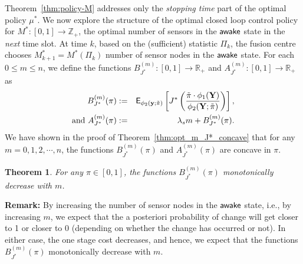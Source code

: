\documentclass[journal]{IEEEtran}
\newcommand{\PPHI}[1]{\phi_2({\bf y} ;\tilde{\pi})}
\newtheorem{theorem}{Theorem}
\newcommand{\wake}{{${\sf awake }$}}
\begin{document}
Theorem~\ref{thm:policy-M} addresses only the {\em stopping time} 
part of the optimal policy $\mu^*$. We now explore the structure of the 
optimal closed loop control policy for $M^*:[0, 1]\to\mathbb{Z}_+$, the 
optimal number of sensors in the {\wake} state in the {\em next} time 
slot. At time $k$, based on the (sufficient) statistic $\Pi_k$, the 
fusion centre chooses $M^*_{k+1}=M^*(\Pi_k)$ number of sensor nodes in
the {\wake} state. For each $0 \le m \le n$, we define the functions 
$B_{J^*}^{(m)}:[0,1]\to\mathbb{R}_+$ and 
$A_{J^*}^{(m)}:[0,1]\to\mathbb{R}_+$ as
\begin{eqnarray*} 
B_{J^*}^{(m)}(\pi) & := & {\mathsf
E}_{\PPHI{m}}\left[J^*\left(\frac{\tilde{\pi}\cdot\phi_1({\bf Y})}{\phi_2({\bf Y};\tilde{\pi})}\right)\right], \\ 
\text{and } A_{J^*}^{(m)}(\pi) & := & \lambda_sm + B_{J^*}^{(m)}({\pi}). 
\end{eqnarray*}
We have shown in the proof of Theorem~\ref{thm:opt_m_J*_concave}
that for any $m=0,1,2,\cdots,n$, the functions $B_{J^*}^{(m)}(\pi)$ 
and $A_{J^*}^{(m)}(\pi)$ are concave in $\pi$.

\begin{theorem}
\label{thm:monotone}
For any $\pi \in [0,1]$, the functions
$B_{J^*}^{(m)}(\pi)$ monotonically decrease with $m$. 
\end{theorem}

\noindent
{\bf Remark:} By increasing the number of sensor nodes in the 
{\wake} state, i.e., by
increasing $m$, we expect that the a posteriori probability of
change will get closer to 1 or closer to 0 (depending on whether the
change has occurred or not). In either case, the
one stage cost decreases, and hence, we expect that the functions   
$B_{J^*}^{(m)}(\pi)$ monotonically decrease with $m$. 
\end{document}
